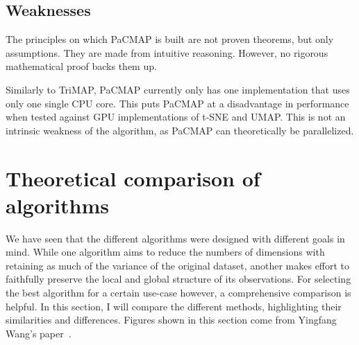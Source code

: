 \subsection{Weaknesses}

The principles on which PaCMAP is built are not proven theorems, but only assumptions. They are made from intuitive reasoning. However, no rigorous mathematical proof backs them up.

Similarly to TriMAP, PaCMAP currently only has one implementation that uses only one single CPU core. This puts PaCMAP at a disadvantage in performance when tested against GPU implementations of t-SNE and UMAP. This is not an intrinsic weakness of the algorithm, as PaCMAP can theoretically be parallelized.

\section{Theoretical comparison of algorithms}

We have seen that the different algorithms were designed with different goals in mind. While one algorithm aims to reduce the numbers of dimensions with retaining as much of the variance of the original dataset, another makes effort to faithfully preserve the local and global structure of its observations. For selecting the best algorithm for a certain use-case however, a comprehensive comparison is helpful. In this section, I will compare the different methods, highlighting their similarities and differences. Figures shown in this section come from Yingfang Wang's paper~\cite{bib:pacmap}.

